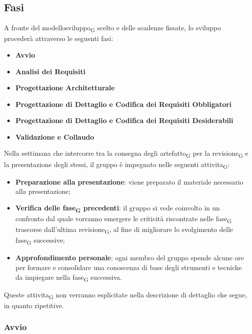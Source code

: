 \subsection{Fasi}

A fronte del modellosviluppo\textsubscript{G} scelto e delle scadenze fissate, lo sviluppo procederà attraverso le seguenti fasi:
\begin{itemize}
	\item \textbf{Avvio}
	\item \textbf{Analisi dei Requisiti}
	\item \textbf{Progettazione Architetturale}
	\item \textbf{Progettazione di Dettaglio e Codifica dei Requisiti Obbligatori}
	\item \textbf{Progettazione di Dettaglio e Codifica dei Requisiti Desiderabili}
	\item \textbf{Validazione e Collaudo}
\end{itemize}


Nella settimana che intercorre tra la consegna degli artefatto\textsubscript{G} per la revisione\textsubscript{G} e la presentazione degli stessi, il gruppo è impegnato nelle seguenti attivita\textsubscript{G}: 
\begin{itemize}
	\item \textbf{Preparazione alla presentazione}: viene preparato il materiale necessario alla presentazione;
	\item \textbf{Verifica delle fase\textsubscript{G} precedenti}: il gruppo si vede coinvolto in un confronto dal quale vorranno emergere le criticità riscontrate nelle fase\textsubscript{G} trascorse dall'ultima revisione\textsubscript{G}, al fine di migliorare lo svolgimento delle fase\textsubscript{G} successive;
	\item \textbf{Approfondimento personale}: ogni membro del gruppo spende alcune ore per formare e consolidare una conoscenza di base degli strumenti e tecniche da impiegare nella fase\textsubscript{G} successiva.
\end{itemize}
Queste attivita\textsubscript{G} non verranno esplicitate nella descrizione di dettaglio che segue, in quanto ripetitive.



\subsubsection{Avvio}


